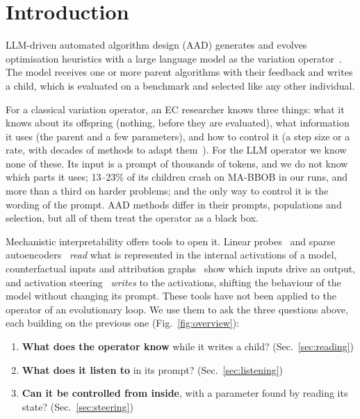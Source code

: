 \section{Introduction}\label{sec:intro}

LLM-driven automated algorithm design (AAD) generates and evolves
optimisation heuristics with a large language model as the variation
operator~\cite{vanstein2025llamea,liu2024eoh,romeraparedes2024funsearch,
ye2024reevo,novikov2025alphaevolve}. The model receives one or more
parent algorithms with their feedback and writes a child, which is
evaluated on a benchmark and selected like any other individual.

For a classical variation operator, an EC researcher knows three
things: what it knows about its offspring (nothing, before they are
evaluated), what information it uses (the parent and a few parameters),
and how to control it (a step size or a rate, with decades of methods
to adapt them~\cite{rechenberg1973}). For the LLM operator we know none
of these. Its input is a prompt of thousands of tokens, and we do not
know which parts it uses; 13--23\% of its children crash on MA-BBOB in
our runs, and more than a third on harder problems; and the only way to control it is the
wording of the prompt. AAD methods differ in their prompts,
populations and selection, but all of them treat the operator as a
black box.

Mechanistic interpretability offers tools to open it. Linear
probes~\cite{alain2016probes} and sparse
autoencoders~\cite{bricken2023monosemanticity,cunningham2024sae}
\emph{read} what is represented in the internal activations of a model,
counterfactual inputs and attribution graphs~\cite{ameisen2025circuits}
show which inputs drive an output, and activation
steering~\cite{turner2023actadd,rimsky2024caa,zou2023repe} \emph{writes}
to the activations, shifting the behaviour of the model without changing
its prompt. These tools have not been applied to the operator of an
evolutionary loop. We use them to ask the three questions above, each
building on the previous one (Fig.~\ref{fig:overview}):
\begin{enumerate}
  \item \textbf{What does the operator know} while it writes a child?
    (Sec.~\ref{sec:reading})
  \item \textbf{What does it listen to} in its prompt?
    (Sec.~\ref{sec:listening})
  \item \textbf{Can it be controlled from inside}, with a parameter
    found by reading its state? (Sec.~\ref{sec:steering})
\end{enumerate}

